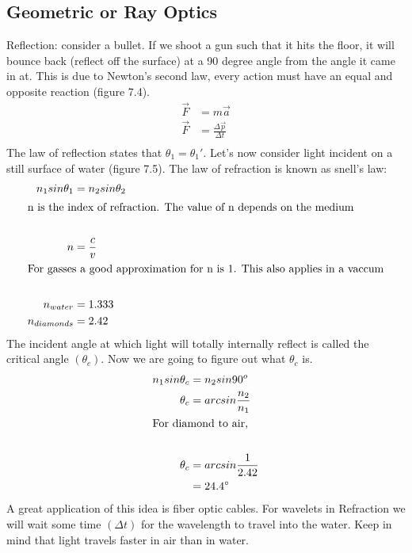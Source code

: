     \subsection{Geometric or Ray Optics}
    Reflection: consider a bullet. If we shoot a gun such that it hits the floor, it will bounce back (reflect off the surface) at a 90 degree angle from the angle it came in at. This is due to Newton's second law, every action must have an equal and opposite reaction (figure 7.4).
    \begin{align*}
        \vec{F}&=m\vec{a}\\
        \vec{F}&=\frac{\Delta\vec{p}}{\Delta t}\\
    \end{align*}
    The law of reflection states that $\theta_1=\theta_1'$. Let's now consider light incident on a still surface of water (figure 7.5). The law of refraction is known as snell's law:
    \begin{align*}
        n_1sin\theta_1&=n_2sin\theta_2\\
        \shortintertext{n is the index of refraction. The value of n depends on the medium}\\
        n&=\frac{c}{v}\\
        \shortintertext{For gasses a good approximation for n is 1. This also applies in a vaccum}\\
        n_{water}&=1.333\\
        n_{diamonds}&=2.42\\
    \end{align*}
    The incident angle at which light will totally internally reflect is called the critical angle $(\theta_c)$. Now we are going to figure out what $\theta_c$ is.
    \begin{align*}
        n_1sin\theta_c&=n_2sin90^o\\
        \theta_c&=arcsin\frac{n_2}{n_1}\\
        \shortintertext{For diamond to air,}\\
        \theta_c&=arcsin\frac{1}{2.42}\\
        &=24.4\si{\degree}\\
    \end{align*}
    A great application of this idea is fiber optic cables. For wavelets in Refraction we will wait some time $(\Delta t)$ for the wavelength to travel into the water. Keep in mind that light travels faster in air than in water.


